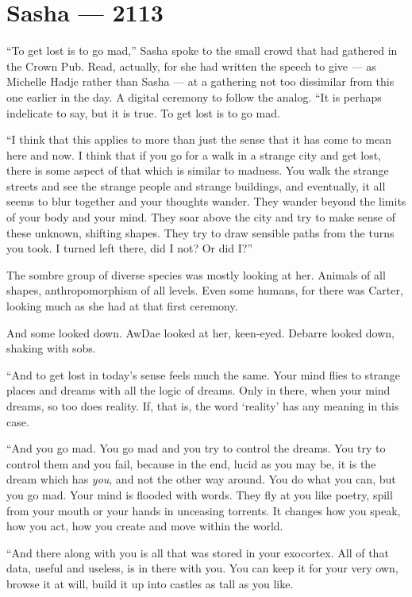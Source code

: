 \hypertarget{sasha-2113}{%
\chapter*{Sasha — 2113}\label{sasha-2113}}

``To get lost is to go mad,'' Sasha spoke to the small crowd that had gathered in the Crown Pub. Read, actually, for she had written the speech to give — as Michelle Hadje rather than Sasha — at a gathering not too dissimilar from this one earlier in the day. A digital ceremony to follow the analog. ``It is perhaps indelicate to say, but it is true. To get lost is to go mad.

``I think that this applies to more than just the sense that it has come to mean here and now. I think that if you go for a walk in a strange city and get lost, there is some aspect of that which is similar to madness. You walk the strange streets and see the strange people and strange buildings, and eventually, it all seems to blur together and your thoughts wander. They wander beyond the limits of your body and your mind. They soar above the city and try to make sense of these unknown, shifting shapes. They try to draw sensible paths from the turns you took. I turned left there, did I not? Or did I?''

The sombre group of diverse species was mostly looking at her. Animals of all shapes, anthropomorphism of all levels. Even some humans, for there was Carter, looking much as she had at that first ceremony.

And some looked down. AwDae looked at her, keen-eyed. Debarre looked down, shaking with sobs.

``And to get lost in today's sense feels much the same. Your mind flies to strange places and dreams with all the logic of dreams. Only in there, when your mind dreams, so too does reality. If, that is, the word `reality' has any meaning in this case.

``And you go mad. You go mad and you try to control the dreams. You try to control them and you fail, because in the end, lucid as you may be, it is the dream which has \emph{you}, and not the other way around. You do what you can, but you go mad. Your mind is flooded with words. They fly at you like poetry, spill from your mouth or your hands in unceasing torrents. It changes how you speak, how you act, how you create and move within the world.

``And there along with you is all that was stored in your exocortex. All of that data, useful and useless, is in there with you. You can keep it for your very own, browse it at will, build it up into castles as tall as you like.

